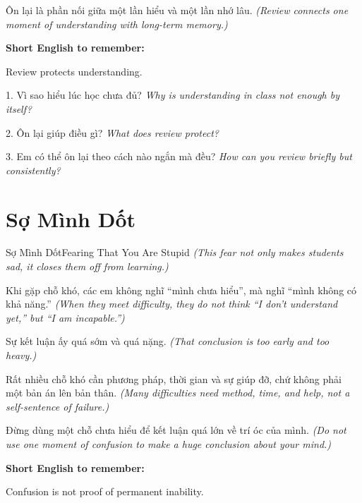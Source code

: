 \begin{baihoc}
Ôn lại là phần nối giữa một lần hiểu và một lần nhớ lâu.
\textit{(Review connects one moment of understanding with long-term memory.)}
\end{baihoc}

\begin{ghinhoanh}
\textbf{Short English to remember:}

Review protects understanding.

\end{ghinhoanh}

\begin{tuhocnhanh}
1. Vì sao hiểu lúc học chưa đủ? \textit{Why is understanding in class not enough by itself?}

2. Ôn lại giúp điều gì? \textit{What does review protect?}

3. Em có thể ôn lại theo cách nào ngắn mà đều? \textit{How can you review briefly but consistently?}
\end{tuhocnhanh}
\ngancach

\section{Sợ Mình Dốt}
\begin{truyen}{Sợ Mình Dốt}{Fearing That You Are Stupid}
\textit{(This fear not only makes students sad, it closes them off from learning.)}

Khi gặp chỗ khó, các em không nghĩ ``mình chưa hiểu'', mà nghĩ ``mình không có khả năng.''
\textit{(When they meet difficulty, they do not think ``I don't understand yet,'' but ``I am incapable.'')}

Sự kết luận ấy quá sớm và quá nặng.
\textit{(That conclusion is too early and too heavy.)}

Rất nhiều chỗ khó cần phương pháp, thời gian và sự giúp đỡ, chứ không phải một bản án lên bản thân.
\textit{(Many difficulties need method, time, and help, not a self-sentence of failure.)}
\end{truyen}

\begin{baihoc}
Đừng dùng một chỗ chưa hiểu để kết luận quá lớn về trí óc của mình.
\textit{(Do not use one moment of confusion to make a huge conclusion about your mind.)}
\end{baihoc}

\begin{ghinhoanh}
\textbf{Short English to remember:}

Confusion is not proof of permanent inability.

\end{ghinhoanh}

